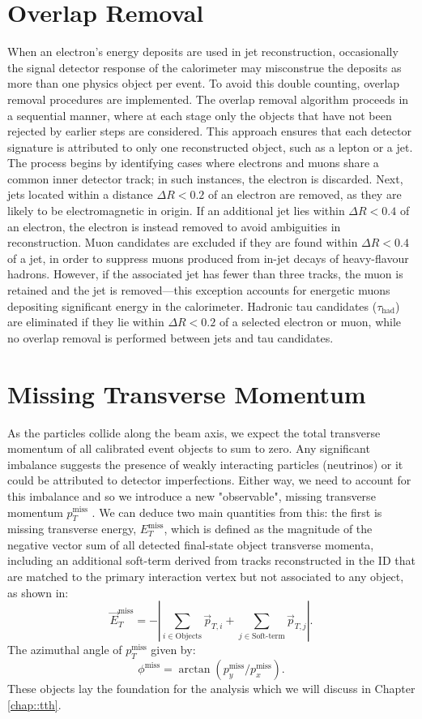 \section{Overlap Removal}
When an electron's energy deposits are used in jet reconstruction, occasionally the signal detector response of the calorimeter may misconstrue the deposits as more than one physics object per event. To avoid this double counting, overlap removal procedures are implemented. The overlap removal algorithm proceeds in a sequential manner, where at each stage only the objects that have not been rejected by earlier steps are considered. This approach ensures that each detector signature is attributed to only one reconstructed object, such as a lepton or a jet. The process begins by identifying cases where electrons and muons share a common inner detector track; in such instances, the electron is discarded. Next, jets located within a distance $\Delta R < 0.2$ of an electron are removed, as they are likely to be electromagnetic in origin. If an additional jet lies within $\Delta R < 0.4$ of an electron, the electron is instead removed to avoid ambiguities in reconstruction. Muon candidates are excluded if they are found within $\Delta R < 0.4$ of a jet, in order to suppress muons produced from in-jet decays of heavy-flavour hadrons. However, if the associated jet has fewer than three tracks, the muon is retained and the jet is removed---this exception accounts for energetic muons depositing significant energy in the calorimeter. Hadronic tau candidates ($\tau_{\text{had}}$) are eliminated if they lie within $\Delta R < 0.2$ of a selected electron or muon, while no overlap removal is performed between jets and tau candidates.
\section{Missing Transverse Momentum}
As the particles collide along the beam axis, we expect the total transverse momentum of all calibrated event objects to sum to zero. Any significant imbalance suggests the presence of weakly interacting particles (neutrinos) or it could be attributed to detector imperfections. Either way, we need to account for this imbalance and so we introduce a new "observable", missing transverse momentum $p_T^{\text{miss}}$ \cite{missing_transverse}. We can deduce two main quantities from this: the first is missing transverse energy, $E_T^{\text{miss}}$, which is defined as the magnitude of the negative vector sum of all detected final-state object transverse momenta, including an additional soft-term derived from tracks reconstructed in the ID that are matched to the primary interaction vertex but not associated to any object, as shown in:
\begin{equation}
\vec{E}_T^{\text{miss}} = - \left| 
\sum_{i \in \text{Objects}} \vec{p}_{T,i} + 
\sum_{j \in \text{Soft-term}} \vec{p}_{T,j} 
\right|.
\end{equation}
The azimuthal angle of $p_T^{\text{miss}}$ given by:
\begin{equation}
    \phi^{\text{miss}} = \arctan(p_y^{\text{miss}}/p_x^{\text{miss}}).
\end{equation}
These objects lay the foundation for the analysis which we will discuss in Chapter \ref{chap::tth}.